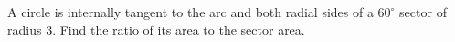 A circle is internally tangent to the arc and both radial sides of a $60^\circ$ sector of radius 3. Find the ratio of its area to the sector area.
